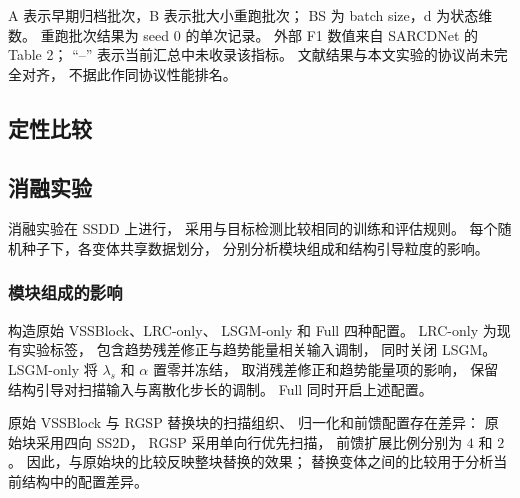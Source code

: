 \documentclass[journal]{IEEEtran}
\begin{document}
\begin{table}[!t]
\smallskip
\begin{minipage}{\linewidth}
\footnotesize
A 表示早期归档批次，B 表示批大小重跑批次；
BS 为 batch size，d 为状态维数。
重跑批次结果为 seed 0 的单次记录。
外部 F1 数值来自 SARCDNet 的 Table 2；
``--'' 表示当前汇总中未收录该指标。
文献结果与本文实验的协议尚未完全对齐，
不据此作同协议性能排名。
\end{minipage}
\end{table}
\subsection{定性比较}
\label{sec:qualitative_comparison}

%
%
%

\subsection{消融实验}
\label{sec:ablation}

消融实验在 SSDD 上进行，
采用与目标检测比较相同的训练和评估规则。
每个随机种子下，各变体共享数据划分，
分别分析模块组成和结构引导粒度的影响。

\subsubsection{模块组成的影响}
\label{sec:component_ablation}

构造原始 VSSBlock、LRC-only、
LSGM-only 和 Full 四种配置。
LRC-only 为现有实验标签，
包含趋势残差修正与趋势能量相关输入调制，
同时关闭 LSGM。
LSGM-only 将 $\lambda_s$ 和 $\alpha$ 置零并冻结，
取消残差修正和趋势能量项的影响，
保留结构引导对扫描输入与离散化步长的调制。
Full 同时开启上述配置。

原始 VSSBlock 与 RGSP 替换块的扫描组织、
归一化和前馈配置存在差异：
原始块采用四向 SS2D，
RGSP 采用单向行优先扫描，
前馈扩展比例分别为 $4$ 和 $2$。
因此，与原始块的比较反映整块替换的效果；
替换变体之间的比较用于分析当前结构中的配置差异。
\end{document}
